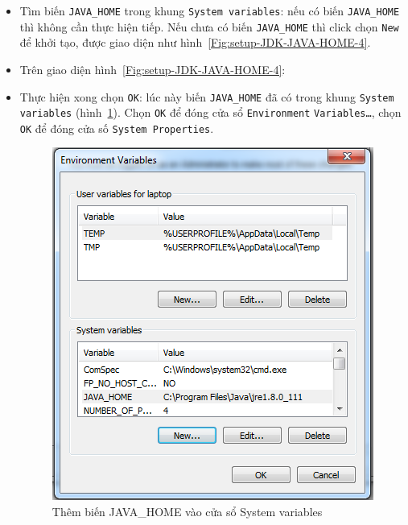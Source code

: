\documentclass[13pt,a4paper]{extreport}
\begin{document}
\begin{itemize}
\begin{itemize}
				\item Tìm biến \verb|JAVA_HOME| trong khung \verb|System variables|: nếu có biến \verb|JAVA_HOME| thì không cần thực hiện tiếp. Nếu chưa có biến \verb|JAVA_HOME| thì click chọn \verb|New| để khởi tạo, được giao diện như hình~\ref{Fig:setup-JDK-JAVA-HOME-4}.
				
				\item Trên giao diện hình~\ref{Fig:setup-JDK-JAVA-HOME-4}:
					
				\item Thực hiện xong chọn \verb|OK|: lúc này biến \verb|JAVA_HOME| đã có trong khung \verb|System variables| (hình~\ref{Fig:setup-JDK-JAVA-HOME-6}). Chọn \verb|OK| để đóng cửa sổ \verb|Environment| \verb|Variables…|, chọn \verb|OK| để đóng cửa số \verb|System Properties|.
					\begin{figure}[!h]
						\begin{center}
							\includegraphics[scale=.65]{setup-JDK-JAVA-HOME-6.png}
						\end{center}
						\caption{Thêm biến JAVA\_HOME vào cửa sổ System variables}
						\label{Fig:setup-JDK-JAVA-HOME-6}
						\vspace{-.5cm}
					\end{figure}
			\end{itemize}
	\end{itemize}
	
\end{document}
